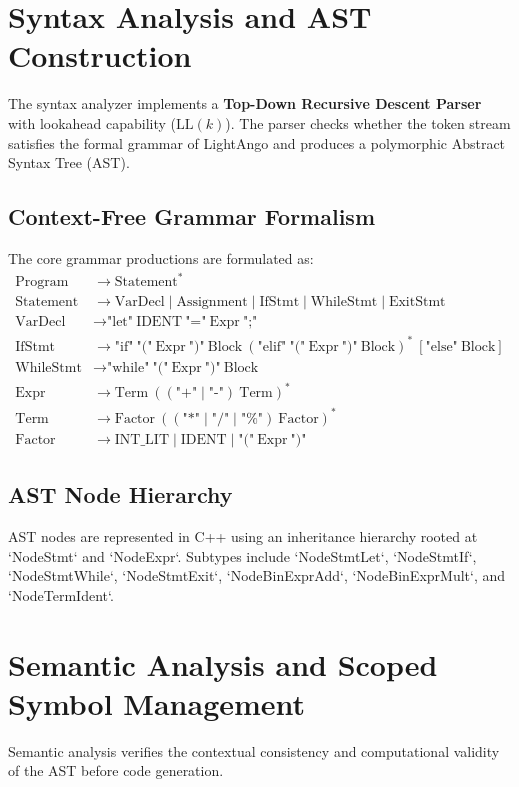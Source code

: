 \section{Syntax Analysis and AST Construction}
The syntax analyzer implements a \textbf{Top-Down Recursive Descent Parser} with lookahead capability ($\text{LL}(k)$). The parser checks whether the token stream satisfies the formal grammar of LightAngo and produces a polymorphic Abstract Syntax Tree (AST).

\subsection{Context-Free Grammar Formalism}
The core grammar productions are formulated as:
\begin{align*}
\text{Program} &\rightarrow \text{Statement}^* \\
\text{Statement} &\rightarrow \text{VarDecl} \mid \text{Assignment} \mid \text{IfStmt} \mid \text{WhileStmt} \mid \text{ExitStmt} \\
\text{VarDecl} &\rightarrow \text{"let"} \ \text{IDENT} \ \text{"="} \ \text{Expr} \ \text{";"} \\
\text{IfStmt} &\rightarrow \text{"if"} \ \text{"("} \ \text{Expr} \ \text{")"} \ \text{Block} \ (\text{"elif"} \ \text{"("} \ \text{Expr} \ \text{")"} \ \text{Block})^* \ [\text{"else"} \ \text{Block}] \\
\text{WhileStmt} &\rightarrow \text{"while"} \ \text{"("} \ \text{Expr} \ \text{")"} \ \text{Block} \\
\text{Expr} &\rightarrow \text{Term} \ ((\text{"+"}\mid\text{"-"}) \ \text{Term})^* \\
\text{Term} &\rightarrow \text{Factor} \ ((\text{"*"}\mid\text{"/"}\mid\text{"\%"}) \ \text{Factor})^* \\
\text{Factor} &\rightarrow \text{INT\_LIT} \mid \text{IDENT} \mid \text{"("} \ \text{Expr} \ \text{")"}
\end{align*}

\subsection{AST Node Hierarchy}
AST nodes are represented in C++ using an inheritance hierarchy rooted at `NodeStmt` and `NodeExpr`. Subtypes include `NodeStmtLet`, `NodeStmtIf`, `NodeStmtWhile`, `NodeStmtExit`, `NodeBinExprAdd`, `NodeBinExprMult`, and `NodeTermIdent`.

\section{Semantic Analysis and Scoped Symbol Management}
Semantic analysis verifies the contextual consistency and computational validity of the AST before code generation.

